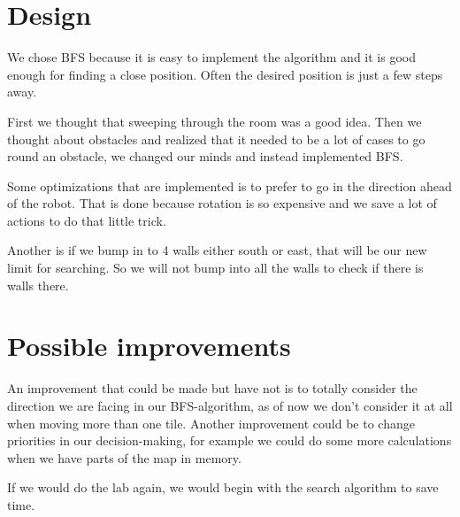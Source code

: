 \documentclass[12pt,a4paper]{article}
\begin{document}
\section{Design}
We chose BFS because it is easy to implement the algorithm and it is good enough for finding a close position. Often the desired position is just a few steps away.

First we thought that sweeping through the room was a good idea. Then we thought about obstacles and realized that it needed to be a lot of cases to go round an obstacle, we changed our minds and instead implemented BFS.

Some optimizations that are implemented is to prefer to go in the direction ahead of the robot. That is done because rotation is so expensive and we save a lot of actions to do that little trick.

Another is if we bump in to 4 walls either south or east, that will be our new limit for searching. So we will not bump into all the walls to check if there is walls there.

\section{Possible improvements}
An improvement that could be made but have not is to totally consider the direction we are facing in our BFS-algorithm, as of now we don’t consider it at all when moving more than one tile.
Another improvement could be to change priorities in our decision-making, for example we could do some more calculations when we have parts of the map in memory.

If we would do the lab again, we would begin with the search algorithm to save time.
\end{document}
